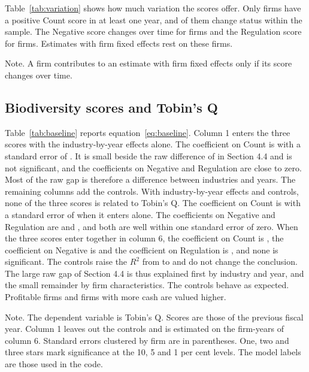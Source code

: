 \documentclass[12pt,a4paper]{article}
\newcommand{\tablenote}[1]{\par\smallskip\begin{minipage}{\linewidth}\footnotesize\setstretch{1.05}#1\end{minipage}}
\newcommand{\widetable}[1]{\resizebox{\ifdim\width>\linewidth\linewidth\else\width\fi}{!}{}}
\begin{document}
Table~\ref{tab:variation} shows how much variation the scores offer. Only \nEverCount{} firms have a positive Count score in at least one year, and \nChangeCount{} of them change status within the sample. The Negative score changes over time for \nChangeNeg{} firms and the Regulation score for \nChangeReg{} firms. Estimates with firm fixed effects rest on these firms.

\begin{table}[!htbp]
\centering\small
\caption{Variation in the scores within the sample}\label{tab:variation}
\widetable{tables/tab_variation}
\tablenote{Note. A firm contributes to an estimate with firm fixed effects only if its score changes over time.}
\end{table}

\subsection{Biodiversity scores and Tobin's Q}

Table~\ref{tab:baseline} reports equation~\eqref{eq:baseline}. Column 1 enters the three scores with the industry-by-year effects alone. The coefficient on Count is \coefBNoCount{} with a standard error of \seBNoCount{}. It is small beside the raw difference of \gapQ{} in Section 4.4 and is not significant, and the coefficients on Negative and Regulation are close to zero. Most of the raw gap is therefore a difference between industries and years. The remaining columns add the controls. With industry-by-year effects and controls, none of the three scores is related to Tobin's Q. The coefficient on Count is \coefBCount{} with a standard error of \seBCount{} when it enters alone. The coefficients on Negative and Regulation are \coefBNeg{} and \coefBReg{}, and both are well within one standard error of zero. When the three scores enter together in column 6, the coefficient on Count is \coefBAllCount{}, the coefficient on Negative is \coefBAllNeg{} and the coefficient on Regulation is \coefBAllReg{}, and none is significant. The controls raise the $R^2$ from \rsqBNo{} to \rsqB{} and do not change the conclusion. The large raw gap of Section 4.4 is thus explained first by industry and year, and the small remainder by firm characteristics. The controls behave as expected. Profitable firms and firms with more cash are valued higher.

\begin{table}[!htbp]
\centering\small
\caption{Biodiversity scores and Tobin's Q with industry-by-year effects}\label{tab:baseline}
\widetable{tables/tab_baseline}
\tablenote{Note. The dependent variable is Tobin's Q. Scores are those of the previous fiscal year. Column 1 leaves out the controls and is estimated on the firm-years of column 6. Standard errors clustered by firm are in parentheses. One, two and three stars mark significance at the 10, 5 and 1 per cent levels. The model labels are those used in the code.}
\end{table}
\end{document}

